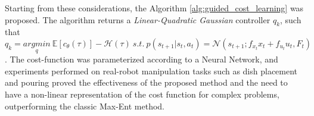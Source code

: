 \label{lqr} Starting from these considerations, the Algorithm \ref{alg:guided_cost_learning} was proposed. The algorithm \cite{levine2014lqr_flm} returns a \textit{Linear-Quadratic Gaussian} controller $q_{k}$, such that $q_{k} = \underset{q}{arg min} \ \mathbb{E}[c_{\theta}(\tau)] - \mathcal{H}(\tau) \ s.t. \ p(s_{t+1}|s_{t},a_{t}) = \mathcal{N}(s_{t+1}; f_{x_t}x_{t}+f_{u_t}u_{t}, F_{t})$.
\noindent The cost-function was parameterized according to a Neural Network, and experiments performed on real-robot manipulation tasks such as dish placement and pouring proved the effectiveness of the proposed method and  the need to have a non-linear representation of the cost function for complex problems, outperforming the classic Max-Ent method.
